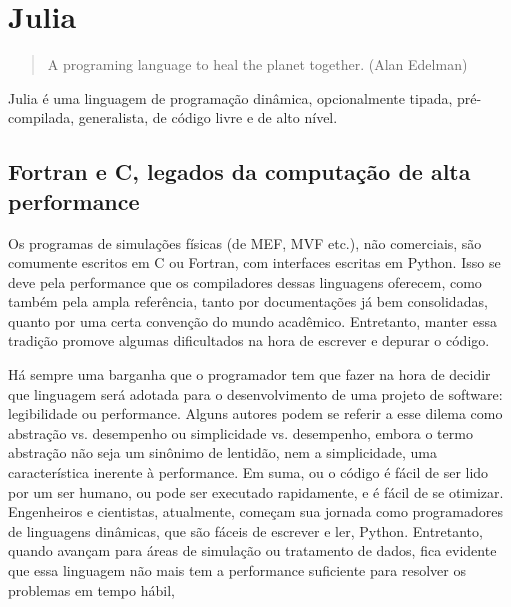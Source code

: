 \chapter{Julia}

\begin{quotation}
    A programing language to heal the planet together.
    (Alan Edelman)
\end{quotation}

Julia é uma linguagem de programação dinâmica, opcionalmente tipada, pré-compilada, generalista, de código livre\footnotemark{} e de alto nível. \cite[capítulo: The scope of Julia]{Sherrington}




\section{Fortran e C, legados da computação de alta performance}

Os programas de simulações físicas (de MEF, MVF etc.), não comerciais, são comumente escritos em C ou Fortran, com interfaces escritas em Python. Isso se deve pela performance que os compiladores dessas linguagens oferecem, como também pela ampla referência, tanto por documentações já bem consolidadas, quanto por uma certa convenção do mundo acadêmico. Entretanto, manter essa tradição promove algumas dificultados na hora de escrever e depurar o código.


Há sempre uma barganha que o programador tem que fazer na hora de decidir que linguagem será adotada para o desenvolvimento de uma projeto de software: legibilidade ou performance. Alguns autores podem se referir a esse dilema como abstração vs. desempenho ou simplicidade vs. desempenho, embora o termo abstração não seja um sinônimo de lentidão, nem a simplicidade, uma característica inerente à performance. Em suma, ou o código é fácil de ser lido por um ser humano, ou pode ser executado rapidamente, e é fácil de se otimizar. Engenheiros e cientistas, atualmente, começam sua jornada como programadores de linguagens dinâmicas, que são fáceis de escrever e ler, Python. Entretanto, quando avançam para áreas de simulação ou tratamento de dados, fica evidente que essa linguagem não mais tem a performance suficiente para resolver os problemas em tempo hábil,

